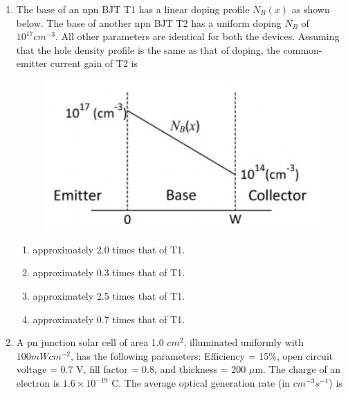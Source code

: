 \documentclass[a4paper, 11pt]{article}
\begin{document}
\begin{enumerate}
    \item The base of an npn BJT T1 has a linear doping profile $N_B(x)$ as shown below. The base of another npn BJT T2 has a uniform doping $N_B$ of $10^{17} cm^{-3}$. All other parameters are identical for both the devices. Assuming that the hole density profile is the same as that of doping, the common-emitter current gain of T2 is
    \begin{figure}[H]
        \centering
        \includegraphics[width=0.6\columnwidth]{figs/Q33.png}
        \caption*{}
        \label{fig:q43}
    \end{figure}
    \begin{enumerate}
        \item approximately 2.0 times that of T1.
        \item approximately 0.3 times that of T1.
        \item approximately 2.5 times that of T1.
        \item approximately 0.7 times that of T1.
    \end{enumerate}

    \hfill{}

    \item A pn junction solar cell of area 1.0 $cm^2$, illuminated uniformly with $100 mW cm^{-2}$, has the following parameters: Efficiency = 15\%, open circuit voltage = 0.7 V, fill factor = 0.8, and thickness = 200 $\mu$m. The charge of an electron is $1.6 \times 10^{-19}$ C. The average optical generation rate (in $cm^{-3}s^{-1}$) is
    \begin{enumerate}
    \end{enumerate}


\end{enumerate}
\end{document}
